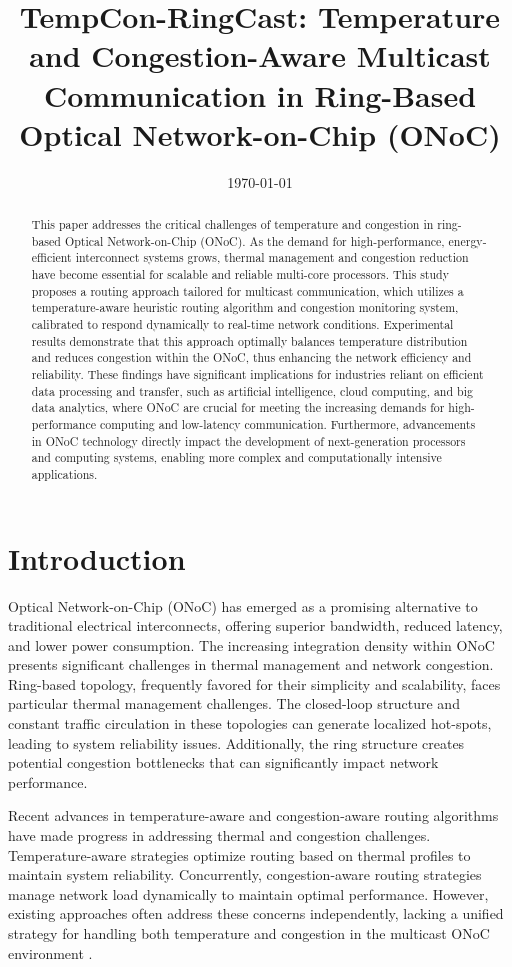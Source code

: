 \documentclass[conference]{IEEEtran}
\title{TempCon-RingCast: Temperature and Congestion-Aware Multicast Communication in Ring-Based Optical Network-on-Chip (ONoC)}
\author{
    \IEEEauthorblockN{Abubeker Yasmin Mustefa\IEEEauthorrefmark{1}}
    \IEEEauthorblockA{\IEEEauthorrefmark{1}Department of Computer science, China Three Gorges University, Yichang , China\\
    Email: moli614360@gmail.com}
}
\date{\today}
\begin{document}
\maketitle

\begin{abstract}
This paper addresses the critical challenges of temperature and congestion in ring-based Optical Network-on-Chip (ONoC). As the demand for high-performance, energy-efficient interconnect systems grows, thermal management and congestion reduction have become essential for scalable and reliable multi-core processors. This study proposes a routing approach tailored for multicast communication, which utilizes a temperature-aware heuristic routing algorithm and congestion monitoring system, calibrated to respond dynamically to real-time network conditions. Experimental results demonstrate that this approach optimally balances temperature distribution and reduces congestion within the ONoC, thus enhancing the network efficiency and reliability. These findings have significant implications for industries reliant on efficient data processing and transfer, such as artificial intelligence, cloud computing, and big data analytics, where ONoC are crucial for meeting the increasing demands for high-performance computing and low-latency communication. Furthermore, advancements in ONoC technology directly impact the development of next-generation processors and computing systems, enabling more complex and computationally intensive applications.
\end{abstract}

\section{Introduction}
Optical Network-on-Chip (ONoC) has emerged as a promising alternative to traditional electrical interconnects, offering superior bandwidth, reduced latency, and lower power consumption. The increasing integration density within ONoC presents significant challenges in thermal management and network congestion. Ring-based topology, frequently favored for their simplicity and scalability, faces particular thermal management challenges. The closed-loop structure and constant traffic circulation in these topologies can generate localized hot-spots, leading to system reliability issues. Additionally, the ring structure creates potential congestion bottlenecks that can significantly impact network performance.

Recent advances in temperature-aware and congestion-aware routing algorithms have made progress in addressing thermal and congestion challenges. Temperature-aware strategies optimize routing based on thermal profiles to maintain system reliability. Concurrently, congestion-aware routing strategies manage network load dynamically to maintain optimal performance. However, existing approaches often address these concerns independently, lacking a unified strategy for handling both temperature and congestion in the multicast ONoC environment \cite{li2021contention}.
\end{document}
